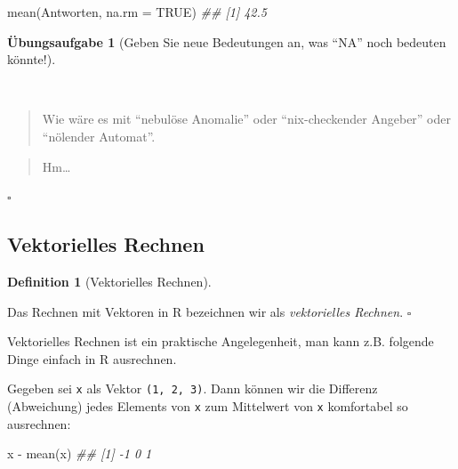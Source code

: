 \documentclass[
  a4paper,
]{scrbook}
\newenvironment{Shaded}{\begin{snugshade}}{\end{snugshade}}
\newcommand{\AttributeTok}[1]{\textcolor[rgb]{0.40,0.45,0.13}{#1}}
\newcommand{\ConstantTok}[1]{\textcolor[rgb]{0.56,0.35,0.01}{#1}}
\newcommand{\DocumentationTok}[1]{\textcolor[rgb]{0.37,0.37,0.37}{\textit{#1}}}
\newcommand{\FunctionTok}[1]{\textcolor[rgb]{0.28,0.35,0.67}{#1}}
\newcommand{\NormalTok}[1]{\textcolor[rgb]{0.00,0.23,0.31}{#1}}
\newcommand{\SpecialCharTok}[1]{\textcolor[rgb]{0.37,0.37,0.37}{#1}}
\theoremstyle{definition}
\theoremstyle{definition}
\newtheorem{definition}{Definition}[chapter]
\theoremstyle{definition}
\newtheorem{exercise}{Übungsaufgabe}[chapter]
\theoremstyle{remark}
\begin{document}
\begin{Shaded}
\begin{Highlighting}[]
\FunctionTok{mean}\NormalTok{(Antworten, }\AttributeTok{na.rm =} \ConstantTok{TRUE}\NormalTok{)}
\DocumentationTok{\#\# [1] 42.5}
\end{Highlighting}
\end{Shaded}

\begin{exercise}[Geben Sie neue Bedeutungen an, was ``NA'' noch bedeuten
könnte!]\protect\hypertarget{exr-na}{}\label{exr-na}

~

\begin{quote}
{} Wie wäre es mit ``nebulöse Anomalie'' oder
``nix-checkender Angeber'' oder ``nölender Automat''.
\end{quote}

\begin{quote}
{} Hm\ldots{}
\end{quote}

\(\square\)

\end{exercise}

\subsection{Vektorielles Rechnen}\label{sec-veccalc}

\begin{definition}[Vektorielles
Rechnen]\protect\hypertarget{def-veccalc}{}\label{def-veccalc}

Das Rechnen mit Vektoren in R bezeichnen wir als \emph{vektorielles
Rechnen}. \(\square\)

\end{definition}

Vektorielles Rechnen ist ein praktische Angelegenheit, man kann z.B.
folgende Dinge einfach in R ausrechnen.

Gegeben sei \texttt{x} als Vektor \texttt{(1,\ 2,\ 3)}. Dann können wir
die Differenz (Abweichung) jedes Elements von \texttt{x} zum Mittelwert
von \texttt{x} komfortabel so ausrechnen:

\begin{Shaded}
\begin{Highlighting}[]
\NormalTok{x }\SpecialCharTok{{-}} \FunctionTok{mean}\NormalTok{(x)}
\DocumentationTok{\#\# [1] {-}1  0  1}
\end{Highlighting}
\end{Shaded}
\end{document}
